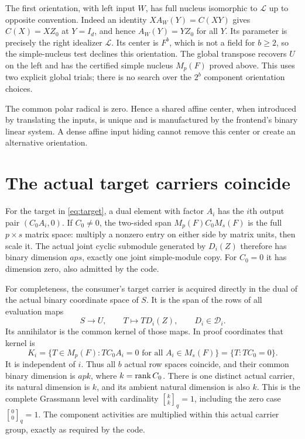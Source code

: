 \documentclass[11pt]{article}
\begin{document}
The first orientation, with left input $W$, has full nucleus isomorphic
to $\mathcal L$ up to opposite convention. Indeed an identity
$X A_W(Y)=C(XY)$ gives $C(X)=XZ_0$ at $Y=I_d$, and hence
$A_W(Y)=YZ_0$ for all $Y$. Its parameter is precisely the right
idealizer $\mathcal L$. Its center is $F^b$, which is not a field for
$b\ge2$, so the simple-nucleus test declines this orientation. The
global transpose recovers $U$ on the left and has the certified simple
nucleus $M_p(F)$ proved above. This uses two explicit global trials;
there is no search over the $2^b$ component orientation choices.

The common polar radical is zero. Hence a shared affine center, when
introduced by translating the inputs, is unique and is manufactured
by the frontend's binary linear system. A dense affine input hiding
cannot remove this center or create an alternative orientation.

\section{The actual target carriers coincide}

For the target in \eqref{eq:target}, a dual element with factor $A_i$
has the $i$th output pair $(C_0A_i,0)$. If $C_0\ne0$, the two-sided
span $M_p(F)C_0M_s(F)$ is the full $p\times s$ matrix space: multiply
a nonzero entry on either side by matrix units, then scale it.
The actual joint cyclic submodule generated by $D_i(Z)$ therefore
has binary dimension $aps$, exactly one joint simple-module copy.
For $C_0=0$ it has dimension zero, also admitted by the code.

For completeness, the consumer's target carrier is acquired directly
in the dual of the actual binary coordinate space of $S$. It is the
span of the rows of all evaluation maps
\[
 S\longrightarrow U,\qquad T\longmapsto T D_i(Z),
                  \qquad D_i\in\mathcal D_i.
\]
Its annihilator is the common kernel of those maps. In proof
coordinates that kernel is
\[
 K_i=\{T\in M_p(F):TC_0A_i=0\text{ for all }A_i\in M_s(F)\}
    =\{T:TC_0=0\}.
\]
It is independent of $i$. Thus all $b$ actual row spaces coincide,
and their common binary dimension is $apk$, where $k=\operatorname{rank} C_0$.
There is one distinct actual carrier, its natural dimension is $k$,
and its ambient natural dimension is also $k$. This is the complete
Grassmann level with cardinality ${k\brack k}_q=1$, including the
zero case ${0\brack0}_q=1$. The component activities are multiplied
within this actual carrier group, exactly as required by the code.
\end{document}
